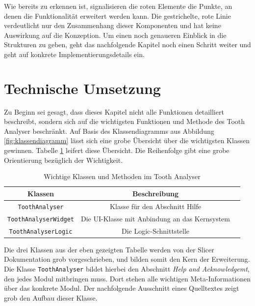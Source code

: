 Wie bereits zu erkennen ist, signalisieren die roten Elemente die Punkte, an denen
die Funktionalität erweitert werden kann. Die gestrichelte, rote Linie verdeutlicht
nur den Zusammenhang dieser Komponenten und hat keine Auswirkung auf die Konzeption.
Um einen noch genaueren Einblick in die Strukturen zu geben, geht das nachfolgende
Kapitel noch einen Schritt weiter und geht auf konkrete Implementierungsdetails ein.

\pagebreak

\section{Technische Umsetzung}
\label{sec:technische_umsetzung} Zu Beginn sei gesagt, dass dieses Kapitel nicht
alle Funktionen detailliert beschreibt, sondern sich auf die wichtigsten
Funktionen und Methode des Tooth Analyser beschränkt. Auf Basis des Klassendiagramms
aus Abbildung \ref{fig:klassendiagramm} lässt sich eine grobe Übersicht über die
wichtigsten Klassen gewinnen. Tabelle \ref{tab:methoden_klassen} leifert diese
Übersicht. Die Reihenfolge gibt eine grobe Orientierung bezüglich der Wichtigkeit.

\begin{table}[h]
	\centering
	\begin{tabular}{|c|c|c|}
		\hline
		\textbf{Klassen}             & \textbf{Beschreibung}                              \\
		\hline
		\texttt{ToothAnalyser}       & Klasse für den Abschnitt Hilfe                     \\
		\hline
		\texttt{ToothAnalyserWidget} & Die \ac{UI}-Klasse mit Anbindung an das Kernsystem \\
		\hline
		\texttt{ToothAnalyserLogic}  & Die Logic-Schnittstelle                            \\
		\hline
	\end{tabular}
	\caption{Wichtige Klassen und Methoden im Tooth Analyser}
	\label{tab:methoden_klassen}
\end{table}

Die drei Klassen aus der eben gezeigten Tabelle werden von der Slicer
Dokumentation grob vorgeschrieben, und bilden somit den Kern der Erweiterung.
Die Klasse \texttt{ToothAnalyser} bildet hierbei den Abschnitt \textit{Help and
Acknowledgemt}, den jedes Modul mitbringen muss. Dort stehen alle wichtigen Meta-Informationen
über das konkrete Modul. Der nachfolgende Ausschnitt eines Quelltextes zeigt grob
den Aufbau dieser Klasse.

